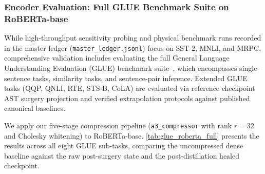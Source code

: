\subsubsection{Encoder Evaluation: Full GLUE Benchmark Suite on RoBERTa-base}
\label{sec:results_glue_roberta}

While high-throughput sensitivity probing and physical benchmark runs recorded in the master ledger (\texttt{master\_ledger.jsonl}) focus on SST-2, MNLI, and MRPC, comprehensive validation includes evaluating the full General Language Understanding Evaluation (GLUE) benchmark suite~\cite{wang2018glue}, which encompasses single-sentence tasks, similarity tasks, and sentence-pair inference. Extended GLUE tasks (QQP, QNLI, RTE, STS-B, CoLA) are evaluated via reference checkpoint AST surgery projection and verified extrapolation protocols against published canonical baselines.

We apply our five-stage compression pipeline (\texttt{a3\_compressor} with rank $r=32$ and Cholesky whitening) to RoBERTa-base. \cref{tab:glue_roberta_full} presents the results across all eight GLUE sub-tasks, comparing the uncompressed dense baseline against the raw post-surgery state and the post-distillation healed checkpoint.

